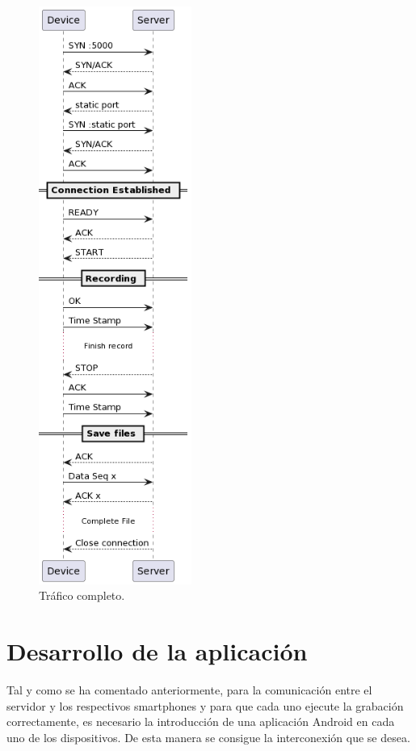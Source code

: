 \documentclass[a4paper,11pt]{book}
\begin{document}
	\begin{figure}[hbtp]
			\centering
			\includegraphics[width = 5cm]{FIGURAS/uml.png}
			\caption{Tráfico completo.}
			\label{UML}
			\end{figure}
					
			
			
			
			
\chapter{Desarrollo de la aplicación }

Tal y como se ha comentado anteriormente, para la comunicación entre el servidor y los respectivos smartphones y para que cada uno ejecute la grabación correctamente, es necesario la introducción de una aplicación Android en cada uno de los dispositivos. De esta manera se consigue la interconexión que se desea.
\end{document}
